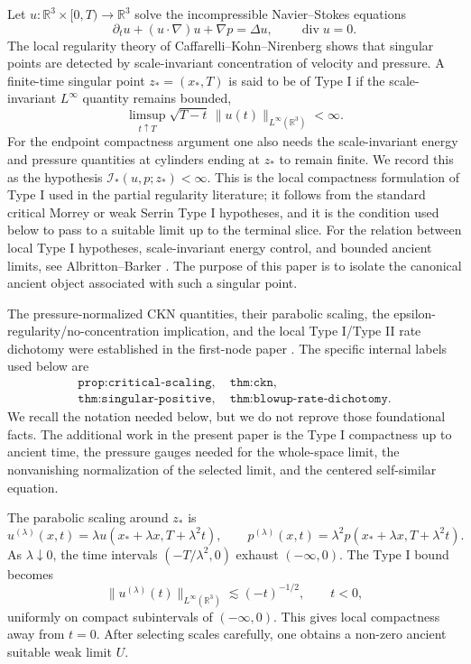 \documentclass[11pt]{amsart}
\theoremstyle{plain}
\theoremstyle{definition}
\theoremstyle{remark}
\numberwithin{equation}{section}
\newcommand{\R}{\mathbb R}
\newcommand{\divergence}{\operatorname{div}}
\newcommand{\calI}{\mathcal I}
\begin{document}
Let \(u:\R^3\times[0,T)\to\R^3\) solve the incompressible Navier--Stokes
equations
\begin{equation}\label{eq:NS}
   \partial_t u+(u\cdot\nabla)u+\nabla p=\Delta u,\qquad
   \divergence u=0.
\end{equation}
The local regularity theory of Caffarelli--Kohn--Nirenberg
\cite{CKN1982} shows that singular points are detected by scale-invariant
concentration of velocity and pressure.  A finite-time singular point
\(z_*=(x_*,T)\) is said to be of Type I if the scale-invariant \(L^\infty\)
quantity remains bounded,
\begin{equation}\label{eq:type-I-bound-intro}
   \limsup_{t\uparrow T}\sqrt{T-t}\,
   \|u(t)\|_{L^\infty(\R^3)}<\infty.
\end{equation}
For the endpoint compactness argument one also needs the scale-invariant
energy and pressure quantities at cylinders ending at \(z_*\) to remain
finite.  We record this as the hypothesis
\(\calI_*(u,p;z_*)<\infty\).  This is the local compactness formulation of
Type I used in the partial regularity literature; it follows from the standard
critical Morrey or weak Serrin Type I hypotheses, and it is the condition used
below to pass to a suitable limit up to the terminal slice.
For the relation between local Type I hypotheses, scale-invariant energy
control, and bounded ancient limits, see Albritton--Barker
\cite[Theorem 1.1]{AlbrittonBarker2019}.
The purpose of this paper is to isolate the canonical ancient object associated
with such a singular point.

The pressure-normalized CKN quantities, their parabolic scaling, the
epsilon-regularity/no-concentration implication, and the local Type I/Type II
rate dichotomy were established in the first-node paper
\cite[Sections 2--5]{Paper0LocalConcentration}.  The specific internal labels
used below are
\begin{align*}
   \texttt{prop:critical-scaling},\quad
   \texttt{thm:ckn},\\
   \texttt{thm:singular-positive},\quad
   \texttt{thm:blowup-rate-dichotomy}.
\end{align*}
We recall the notation needed below, but we do not reprove those foundational
facts.  The additional work in the present paper is the Type I compactness up
to ancient time, the pressure gauges needed for the whole-space limit, the
nonvanishing normalization of the selected limit, and the centered
self-similar equation.

The parabolic scaling around \(z_*\) is
\begin{equation}\label{eq:basic-rescaling-intro}
   u^{(\lambda)}(x,t)
   =
   \lambda u(x_*+\lambda x,T+\lambda^2t),\qquad
   p^{(\lambda)}(x,t)
   =
   \lambda^2 p(x_*+\lambda x,T+\lambda^2t).
\end{equation}
As \(\lambda\downarrow0\), the time intervals
\(( -T/\lambda^2,0)\) exhaust \((-\infty,0)\).  The Type I bound becomes
\[
   \|u^{(\lambda)}(t)\|_{L^\infty(\R^3)}
   \lesssim (-t)^{-1/2},
   \qquad t<0,
\]
uniformly on compact subintervals of \((-\infty,0)\).  This gives local
compactness away from \(t=0\).  After selecting scales carefully, one obtains a
non-zero ancient suitable weak limit \(U\).
\end{document}
